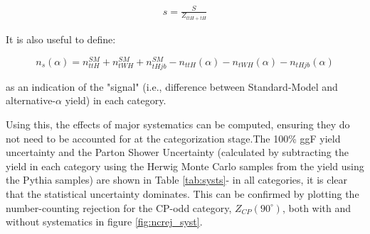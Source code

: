 \begin{align}
s = \frac{S}{Z_{ttH+tH}}
\label{eq:statunc}
\end{align}

It is also useful to define:

\begin{equation}
n_{s}(\alpha) = n_{ttH}^{SM} + n_{tWH}^{SM} + n_{tHjb}^{SM} - n_{ttH}(\alpha) - n_{tWH}(\alpha) - n_{tHjb}(\alpha)
\end{equation}

as an indication of the "signal" (i.e., difference between Standard-Model and alternative-$\alpha$ yield) in each category. 

\begin{figure}
\end{figure}

Using this, the effects of major systematics can be computed, ensuring they do not need to be accounted for at the categorization stage.The 100\% ggF yield uncertainty and the Parton Shower Uncertainty (calculated by subtracting the yield in each category using the Herwig Monte Carlo samples from the yield using the Pythia samples) are shown in Table \ref{tab:systs}- in all categories, it is clear that the statistical uncertainty dominates. This can be confirmed by plotting the number-counting rejection for the CP-odd category, $Z_{CP}(90^{\circ})$, both with and without systematics in figure \ref{fig:ncrej_syst}. 


